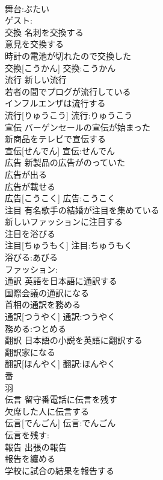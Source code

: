 \documentclass[8pt]{extreport}
\begin{document}
\begin{CJK}{UTF8}{min}
\\	舞台:ぶたい
\\	ゲスト:
\\	交換	名刺を交換する 
\\	意見を交換する 
\\	時計の電池が切れたので交換した 
\\	交換[こうかん]			交換:こうかん
\\	流行	新しい流行 
\\	若者の間でプログが流行している 
\\	インフルエンザは流行する 
\\	流行[りゅうこう]			流行:りゅうこう
\\	宣伝	バーゲンセールの宣伝が始まった 
\\	新商品をテレビで宣伝する 
\\	宣伝[せんでん]			宣伝:せんでん
\\	広告	新製品の広告がのっていた 
\\	広告が出る 
\\	広告が載せる 
\\	広告[こうこく]			広告:こうこく
\\	注目	有名歌手の結婚が注目を集めている 
\\	新しいファッションに注目する 
\\	注目を浴びる 
\\	注目[ちゅうもく]			注目:ちゅうもく
\\	浴びる:あびる
\\	ファッション:
\\	通訳	英語を日本語に通訳する 
\\	国際会議の通訳になる 
\\	首相の通訳を務める 
\\	通訳[つうやく]			通訳:つうやく
\\	務める:つとめる
\\	翻訳	日本語の小説を英語に翻訳する 
\\	翻訳家になる 
\\	翻訳[ほんやく]			翻訳:ほんやく
\\	番 
\\	羽 
\\	伝言	留守番電話に伝言を残す 
\\	欠席した人に伝言する 
\\	伝言[でんごん]			伝言:でんごん
\\	伝言を残す:
\\	報告	出張の報告 
\\	報告を纏める 
\\	学校に試合の結果を報告する 

\end{CJK}
\end{document}

